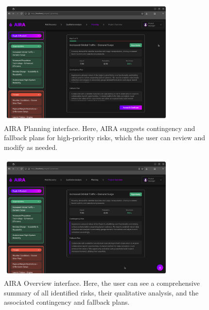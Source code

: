 \begin{figure}[H]
    \centering
    \includegraphics[width=0.8\textwidth]{figures/screenshots/planning.png}
    \caption{AIRA Planning interface. Here, AIRA
    suggests contingency and fallback plans for
    high-priority risks, which the user can review
    and modify as needed.}
    \label{fig:planning}
\end{figure}

\begin{figure}[H]
    \centering
    \includegraphics[width=0.8\textwidth]{figures/screenshots/overview.png}
    \caption{AIRA Overview interface. Here, the user
    can see a comprehensive summary of all identified
    risks, their qualitative analysis, and the
    associated contingency and fallback plans.}
    \label{fig:overview}
\end{figure}

